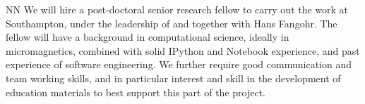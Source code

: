 \begin{participant}[type=R, PM=32]{NN}
  We will hire a post-doctoral senior research fellow to carry out the work
  at Southampton, under the leadership of and together with Hans
  Fangohr. The fellow will have a background in computational science,
  ideally in micromagnetics, combined with solid IPython and
  \Jupyter{} Notebook experience, and past experience of software
  engineering. We further require good communication and team working
  skills, and in particular interest and skill in the development of
  education materials to best support this part of the project.
\end{participant}